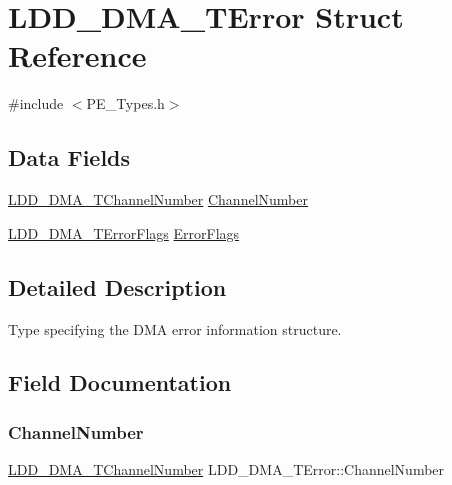 \hypertarget{struct_l_d_d___d_m_a___t_error}{}\section{L\+D\+D\+\_\+\+D\+M\+A\+\_\+\+T\+Error Struct Reference}
\label{struct_l_d_d___d_m_a___t_error}


{\ttfamily \#include $<$P\+E\+\_\+\+Types.\+h$>$}

\subsection*{Data Fields}
\begin{DoxyCompactItemize}
\item 
\hyperlink{group___p_e___types__module_gad268d607015891269cb015faa8bc0dac}{L\+D\+D\+\_\+\+D\+M\+A\+\_\+\+T\+Channel\+Number} \hyperlink{struct_l_d_d___d_m_a___t_error_abc8d0c6909178bc7fe3957b7c01afd08}{Channel\+Number}
\item 
\hyperlink{group___p_e___types__module_gaea6d9250a094d0f060ae12a0b7abb474}{L\+D\+D\+\_\+\+D\+M\+A\+\_\+\+T\+Error\+Flags} \hyperlink{struct_l_d_d___d_m_a___t_error_a9dd0a645e1763b4daa0058b1b29c4ad7}{Error\+Flags}
\end{DoxyCompactItemize}


\subsection{Detailed Description}
Type specifying the D\+MA error information structure. 

\subsection{Field Documentation}
\mbox{\label{struct_l_d_d___d_m_a___t_error_abc8d0c6909178bc7fe3957b7c01afd08}} 
\subsubsection{\texorpdfstring{Channel\+Number}{ChannelNumber}}
{\footnotesize\ttfamily \hyperlink{group___p_e___types__module_gad268d607015891269cb015faa8bc0dac}{L\+D\+D\+\_\+\+D\+M\+A\+\_\+\+T\+Channel\+Number} L\+D\+D\+\_\+\+D\+M\+A\+\_\+\+T\+Error\+::\+Channel\+Number}

